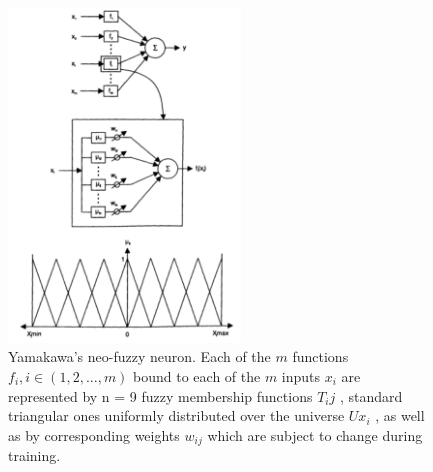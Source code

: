 \begin{figure}[h!]
  \centering
	\captionsetup{width=24pc}
    \includegraphics[width=0.55\textwidth]{images/neuro_fuzzy_model.png}
	\caption{Yamakawa's neo-fuzzy neuron. Each of the $m$ functions $f_i, i \in (1, 2, ..., m)$ bound to each of the $m$ inputs $x_i$ are represented by n = 9 fuzzy membership functions $T_ij$ , standard triangular ones uniformly distributed over the universe $Ux_i$ , as well as by corresponding weights $w_{ij}$ which are subject to change during training.}
	\label{fig:neuro_fuzzy_model}
\end{figure}